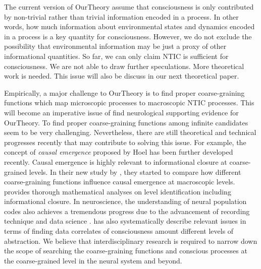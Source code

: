 \documentclass[utf8]{article}
\begin{document}
        The current version of \ac{OurTheory} assume that consciousness is only contributed by  non-trivial rather than trivial information encoded in a process. In other words, how much information about environmental states and dynamics encoded in a process is a key quantity for consciousness. However, we do not exclude the possibility that environmental information may be just a proxy of other informational quantities. So far, we can only claim NTIC is sufficient for consciousness. We are not able to draw further speculations. More theoretical work is needed. This issue will also be discuss in our next theoretical paper. 
        
        
        
        
        
        Empirically, a major challenge to \ac{OurTheory} is to find proper coarse-graining functions which map microscopic processes to macroscopic NTIC processes. This will become an imperative issue of find neurological supporting evidence for \ac{OurTheory}. To find proper coarse-graining functions among infinite candidates \citep{price2007causation} seem to be very challenging. Nevertheless, there are still theoretical and technical progresses recently that may contribute to  solving this issue. For example, the concept of \textit{causal emergence} proposed by Hoel \citep{Hoel19790, Hoel2018} has been further developed recently. Causal emergence is highly relevant to informational closure at coarse-grained levels. In their new study by \cite{klein2019uncertainty}, they started to compare how different coarse-graining functions influence causal emergence at macroscopic levels. \cite{PFANTE.2014, PFANTE.2014b} provides thorough mathematical analyses on level identification including informational closure. In neuroscience, the understanding of neural population codes also achieves a tremendous progress due to the advancement of recording technique and data science \citep{Kohn2016, panzeri2015neural}. \cite{Gamez2016} has also systematically describe relevant issues in terms of finding data correlates of consciousness amount different levels of abstraction. We believe that interdisciplinary research is required to narrow down the scope of searching the coarse-graining functions and conscious processes at the coarse-grained level in the neural system and beyond. 
        
\end{document}
